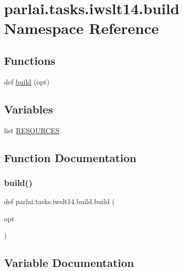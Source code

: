 \hypertarget{namespaceparlai_1_1tasks_1_1iwslt14_1_1build}{}\section{parlai.\+tasks.\+iwslt14.\+build Namespace Reference}
\label{namespaceparlai_1_1tasks_1_1iwslt14_1_1build}
\subsection*{Functions}
\begin{DoxyCompactItemize}
\item 
def \hyperlink{namespaceparlai_1_1tasks_1_1iwslt14_1_1build_a88091774178185753ae29ddad310f0ec}{build} (opt)
\end{DoxyCompactItemize}
\subsection*{Variables}
\begin{DoxyCompactItemize}
\item 
list \hyperlink{namespaceparlai_1_1tasks_1_1iwslt14_1_1build_aaef6af8a8bc8e56bd2baea298aec01fb}{R\+E\+S\+O\+U\+R\+C\+ES}
\end{DoxyCompactItemize}


\subsection{Function Documentation}
\mbox{\label{namespaceparlai_1_1tasks_1_1iwslt14_1_1build_a88091774178185753ae29ddad310f0ec}} 
\subsubsection{\texorpdfstring{build()}{build()}}
{\footnotesize\ttfamily def parlai.\+tasks.\+iwslt14.\+build.\+build (\begin{DoxyParamCaption}\item[{}]{opt }\end{DoxyParamCaption})}



\subsection{Variable Documentation}
\mbox{\label{namespaceparlai_1_1tasks_1_1iwslt14_1_1build_aaef6af8a8bc8e56bd2baea298aec01fb}} 
